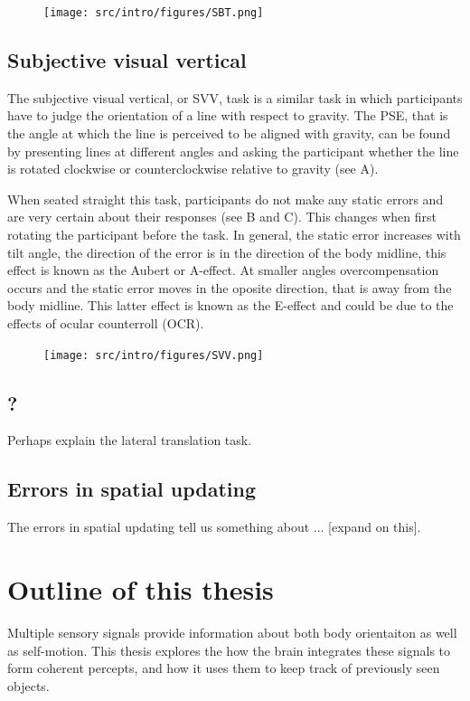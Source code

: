 \begin{figure}
    \texttt{[image: src/intro/figures/SBT.png]}

    \caption{}
    \label{intro:fig4}
\end{figure}


\subsection{Subjective visual vertical}
The subjective visual vertical, or SVV, task is a similar task in which participants have to judge the orientation of a line with respect to gravity. The PSE, that is the angle at which the line is perceived to be aligned with gravity, can be found by presenting lines at different angles and asking the participant whether the line is rotated clockwise or counterclockwise relative to gravity (see A).

When seated straight this task, participants do not make any static errors and are very certain about their responses (see B and C). This changes when first rotating the participant before the task. In general, the static error increases with tilt angle, the direction of the error is in the direction of the body midline, this effect is known as the Aubert or A-effect. At smaller angles overcompensation occurs and the static error moves in the oposite direction, that is away from the body midline. This latter effect is known as the E-effect and could be due to the effects of ocular counterroll (OCR).

\begin{figure}
    \texttt{[image: src/intro/figures/SVV.png]}

    \caption{}
    \label{intro:fig5}
\end{figure}


\subsection{?}

Perhaps explain the lateral translation task.

\subsection{Errors in spatial updating}

The errors in spatial updating tell us something about ... [expand on this].


\section{Outline of this thesis}
Multiple sensory signals provide information about both body orientaiton as well as self-motion. This thesis explores the how the brain integrates these signals to form coherent percepts, and how it uses them to keep track of previously seen objects.

